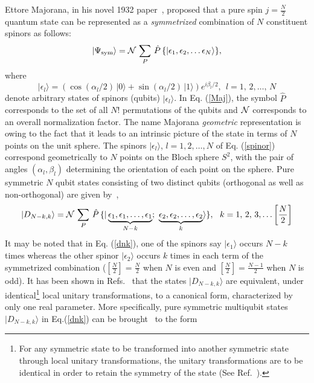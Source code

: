 \documentclass[pra,a4paper,showpacs,superscriptaddress]{revtex4}
\newcommand{\be}{\begin{equation}}
\newcommand{\ee}{\end{equation}}
\begin{document}
Ettore Majorana, in his novel 1932 paper~\cite{maj}, proposed that a pure spin $j=\frac{N}{2}$ quantum state can  be represented as a {\em symmetrized} combination of $N$ constituent spinors as follows:
\begin{equation}
\label{Maj}
\vert \Psi_{\rm sym}\rangle={\cal N}\, \sum_{P}\, \hat{P}\, \{\vert \epsilon_1, \epsilon_2, 
\ldots  \epsilon_N \rangle\}, 
\end{equation}  
where 
\begin{equation}
\label{spinor}
\vert\epsilon_l\rangle= \left(
\cos(\alpha_l/2)\, \vert 0\rangle +
\sin(\alpha_l/2) \, \vert 1\rangle\right) e^{i\beta_l/2},\ \ l=1,\,2,\ldots,\,N 
\end{equation}
denote arbitrary states of spinors (qubits) $\vert\epsilon_l\rangle$. 
In Eq. (\ref{Maj}), the symbol $\hat{P}$ corresponds to the set of all $N!$ permutations of the qubits and ${\cal N}$ corresponds to an overall normalization factor. 
The name Majorana {\emph {geometric}} representation is owing to the fact that it leads to an intrinsic picture of the  state in terms of 
$N$ points on the unit sphere.  The spinors $\vert \epsilon_l\rangle$, $l=1,2,\ldots, N$ of Eq. (\ref{spinor}) correspond geometrically to $N$ points on the Bloch sphere $S^2$, with the pair of angles $(\alpha_l,\beta_l)$ determining the orientation of each point on the sphere.  
Pure symmetric $N$ qubit states consisting of two distinct qubits (orthogonal as well as non-orthogonal)  
are given by~\cite{solano,bastin,usrmaj}, 
\be
\label{dnk}
\vert D_{N-k, k}\rangle = {\cal N}\, \sum_{P}\, \hat{P}\,\{ \vert \underbrace{\epsilon_1, \epsilon_1,
\ldots , \epsilon_1}_{N-k};\ \underbrace{\epsilon_2, \epsilon_2,\ldots , \epsilon_2}_{k}\rangle\}, \ \ k=1,\,2,\,3,\ldots \left[\frac{N}{2}\right] 
\ee 
It may be noted that in Eq. (\ref{dnk}), one of the spinors say $\vert \epsilon_1 \rangle$ occurs $N-k$ times whereas the  other spinor $\vert \epsilon_2 \rangle$ occurs $k$ times in each term of the symmetrized combination ($\left[\frac{N}{2}\right]=\frac{N}{2}$ when $N$ is even and $\left[\frac{N}{2}\right]=\frac{N-1}{2}$ when $N$ is odd).  
It has been shown in Refs.~\cite{sudha,usrmaj} that the states $\vert D_{N-k, k}\rangle$ are equivalent, under identical\footnote{For any symmetric state to be transformed into another symmetric state through local unitary transformations, the unitary transformations are to be identical in order to retain the symmetry of the state (See Ref.~\cite{usrmaj}).} local unitary transformations, to a canonical form, characterized by only one real parameter. More specifically, pure symmetric multiqubit states $\vert D_{N-k, k}\rangle$ in Eq.(\ref{dnk}) can be brought~\cite{sudha} to the form
\end{document}
